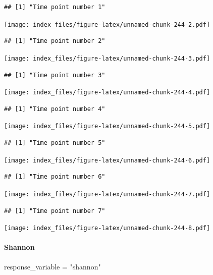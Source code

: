 \documentclass[
]{article}
\newenvironment{Shaded}{\begin{snugshade}}{\end{snugshade}}
\newcommand{\NormalTok}[1]{#1}
\newcommand{\OtherTok}[1]{\textcolor[rgb]{0.56,0.35,0.01}{#1}}
\newcommand{\StringTok}[1]{\textcolor[rgb]{0.31,0.60,0.02}{#1}}
\begin{document}
\begin{verbatim}
## [1] "Time point number 1"
\end{verbatim}

\texttt{[image: index\_files/figure-latex/unnamed-chunk-244-2.pdf]}

\begin{verbatim}
## [1] "Time point number 2"
\end{verbatim}

\texttt{[image: index\_files/figure-latex/unnamed-chunk-244-3.pdf]}

\begin{verbatim}
## [1] "Time point number 3"
\end{verbatim}

\texttt{[image: index\_files/figure-latex/unnamed-chunk-244-4.pdf]}

\begin{verbatim}
## [1] "Time point number 4"
\end{verbatim}

\texttt{[image: index\_files/figure-latex/unnamed-chunk-244-5.pdf]}

\begin{verbatim}
## [1] "Time point number 5"
\end{verbatim}

\texttt{[image: index\_files/figure-latex/unnamed-chunk-244-6.pdf]}

\begin{verbatim}
## [1] "Time point number 6"
\end{verbatim}

\texttt{[image: index\_files/figure-latex/unnamed-chunk-244-7.pdf]}

\begin{verbatim}
## [1] "Time point number 7"
\end{verbatim}

\texttt{[image: index\_files/figure-latex/unnamed-chunk-244-8.pdf]}

\hypertarget{shannon-2}{%
\paragraph{Shannon}\label{shannon-2}}

\begin{Shaded}
\begin{Highlighting}[]
\NormalTok{response\_variable }\OtherTok{=} \StringTok{"shannon"}
\end{Highlighting}
\end{Shaded}
\end{document}
